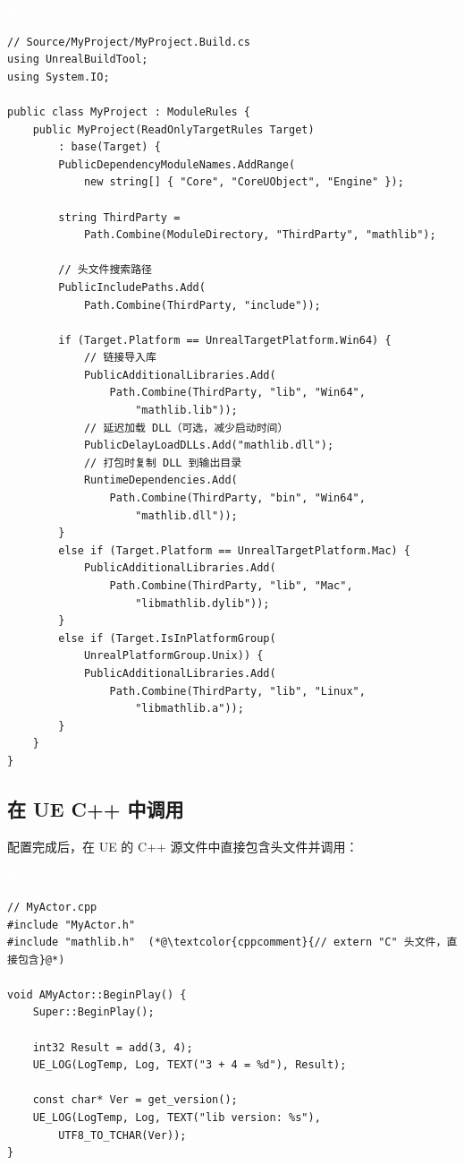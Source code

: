 \documentclass[12pt,a4paper,fontset=fandol]{ctexbook}
\newcommand{\cpplabel}{%
  \begin{tcolorbox}[enhanced,colback=cppheadbg,colframe=cppheadbg,
    arc=1mm,boxrule=0mm,left=6pt,right=6pt,top=2pt,bottom=2pt,
    halign=left,oversize]
    \textcolor{white}{\small\bfseries C++}
  \end{tcolorbox}\vspace{-4pt}}
\newcommand{\csharplabel}{%
  \begin{tcolorbox}[enhanced,colback=csharpheadbg,colframe=csharpheadbg,
    arc=1mm,boxrule=0mm,left=6pt,right=6pt,top=2pt,bottom=2pt,
    halign=left,oversize]
    \textcolor{white}{\small\bfseries C\#}
  \end{tcolorbox}\vspace{-4pt}}
\newcommand{\cpp}[1]{C++#1}
\begin{document}
\csharplabel
\begin{lstlisting}[style=csharpstyle]
// Source/MyProject/MyProject.Build.cs
using UnrealBuildTool;
using System.IO;

public class MyProject : ModuleRules {
    public MyProject(ReadOnlyTargetRules Target)
        : base(Target) {
        PublicDependencyModuleNames.AddRange(
            new string[] { "Core", "CoreUObject", "Engine" });

        string ThirdParty =
            Path.Combine(ModuleDirectory, "ThirdParty", "mathlib");

        // 头文件搜索路径
        PublicIncludePaths.Add(
            Path.Combine(ThirdParty, "include"));

        if (Target.Platform == UnrealTargetPlatform.Win64) {
            // 链接导入库
            PublicAdditionalLibraries.Add(
                Path.Combine(ThirdParty, "lib", "Win64",
                    "mathlib.lib"));
            // 延迟加载 DLL（可选，减少启动时间）
            PublicDelayLoadDLLs.Add("mathlib.dll");
            // 打包时复制 DLL 到输出目录
            RuntimeDependencies.Add(
                Path.Combine(ThirdParty, "bin", "Win64",
                    "mathlib.dll"));
        }
        else if (Target.Platform == UnrealTargetPlatform.Mac) {
            PublicAdditionalLibraries.Add(
                Path.Combine(ThirdParty, "lib", "Mac",
                    "libmathlib.dylib"));
        }
        else if (Target.IsInPlatformGroup(
            UnrealPlatformGroup.Unix)) {
            PublicAdditionalLibraries.Add(
                Path.Combine(ThirdParty, "lib", "Linux",
                    "libmathlib.a"));
        }
    }
}
\end{lstlisting}

\subsection{在 UE C++ 中调用}

配置完成后，在 UE 的 \cpp{} 源文件中直接包含头文件并调用：

\cpplabel
\begin{lstlisting}[style=cppstyle]
// MyActor.cpp
#include "MyActor.h"
#include "mathlib.h"  (*@\textcolor{cppcomment}{// extern "C" 头文件，直接包含}@*)

void AMyActor::BeginPlay() {
    Super::BeginPlay();

    int32 Result = add(3, 4);
    UE_LOG(LogTemp, Log, TEXT("3 + 4 = %d"), Result);

    const char* Ver = get_version();
    UE_LOG(LogTemp, Log, TEXT("lib version: %s"),
        UTF8_TO_TCHAR(Ver));
}
\end{lstlisting}
\end{document}
